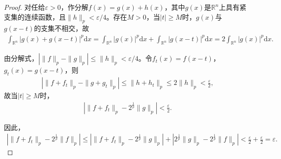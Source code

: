 \documentclass[../../main.tex]{subfiles}%
\begin{document}
\begin{proof}
对任给$\varepsilon>0$，作分解$f(x)=g(x)+h(x)$，其中$g(x)$是$\mathbb{R}^n$上具有紧支集的连续函数，且$\|h\|_p<\varepsilon/4$。存在$M>0$，当$|t|\geqslant M$时，$g(x)$与$g(x-t)$的支集不相交，故
\begin{align*}
\int_{\mathbb{R}^n}|g(x)+g(x-t)|^p\mathrm{d}x=\int_{\mathbb{R}^n}|g(x)|^p\mathrm{d}x+\int_{\mathbb{R}^n}|g(x-t)|^p\mathrm{d}x=2\int_{\mathbb{R}^n}|g(x)|^p\mathrm{d}x.
\end{align*}

由分解式，$|\|f\|_p-\|g\|_p|\leqslant\|h\|_p<\varepsilon/4$。令$f_t(x)=f(x-t)$，$g_t(x)=g(x-t)$，则
\begin{align*}
|\|f+f_t\|_p-\|g+g_t\|_p|\leqslant\|h+h_t\|_p\leqslant2\|h\|_p<\frac{\varepsilon}{2},
\end{align*}
故当$|t|\geqslant M$时，
\begin{align*}
|\|f+f_t\|_p-2^{\frac{1}{p}}\|g\|_p|<\frac{\varepsilon}{2}.
\end{align*}

因此，
\begin{align*}
|\|f+f_t\|_p-2^{\frac{1}{p}}\|f\|_p|\leqslant|\|f+f_t\|_p-2^{\frac{1}{p}}\|g\|_p|+|2^{\frac{1}{p}}\|g\|_p-2^{\frac{1}{p}}\|f\|_p|
<\frac{\varepsilon}{2}+\frac{\varepsilon}{2}=\varepsilon.
\end{align*}
\end{proof}
\end{document}

